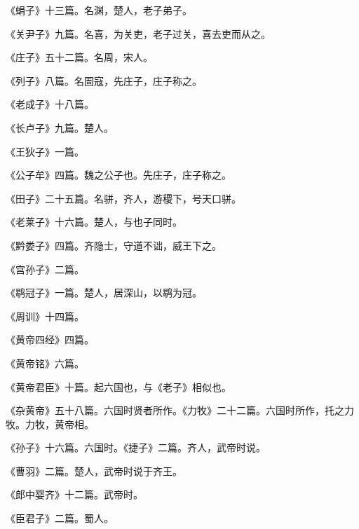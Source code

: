 \documentclass[12pt,UTF8]{ctexbook}
\begin{document}
《蜎子》十三篇。名渊，楚人，老子弟子。



《关尹子》九篇。名喜，为关吏，老子过关，喜去吏而从之。



《庄子》五十二篇。名周，宋人。



《列子》八篇。名圄寇，先庄子，庄子称之。



《老成子》十八篇。



《长卢子》九篇。楚人。



《王狄子》一篇。



《公子牟》四篇。魏之公子也。先庄子，庄子称之。



《田子》二十五篇。名骈，齐人，游稷下，号天口骈。



《老莱子》十六篇。楚人，与也子同时。



《黔娄子》四篇。齐隐士，守道不诎，威王下之。



《宫孙子》二篇。



《鹖冠子》一篇。楚人，居深山，以鹖为冠。



《周训》十四篇。



《黄帝四经》四篇。



《黄帝铭》六篇。



《黄帝君臣》十篇。起六国也，与《老子》相似也。



《杂黄帝》五十八篇。六国时贤者所作。《力牧》二十二篇。六国时所作，托之力牧。力牧，黄帝相。



《孙子》十六篇。六国时。《捷子》二篇。齐人，武帝时说。



《曹羽》二篇。楚人，武帝时说于齐王。



《郎中婴齐》十二篇。武帝时。



《臣君子》二篇。蜀人。
\end{document}
